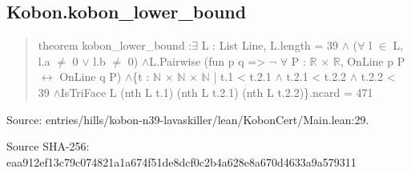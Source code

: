\documentclass[11pt,a4paper]{article}
\begin{document}
\begin{samepage}
\subsection{Kobon.kobon\_lower\_bound}
\begin{quote}\small\ttfamily theorem kobon\_lower\_bound :\newline     \ensuremath{\exists} L : List Line, L.length = 39 \ensuremath{\wedge} (\ensuremath{\forall} l \ensuremath{\in} L, l.a \ensuremath{\neq} 0 \ensuremath{\vee} l.b \ensuremath{\neq} 0) \ensuremath{\wedge}\newline       L.Pairwise (fun p q => \ensuremath{\neg} \ensuremath{\forall} P : \ensuremath{\mathbb{R}} \ensuremath{\times} \ensuremath{\mathbb{R}}, OnLine p P \ensuremath{\leftrightarrow} OnLine q P) \ensuremath{\wedge}\newline       \{t : \ensuremath{\mathbb{N}} \ensuremath{\times} \ensuremath{\mathbb{N}} \ensuremath{\times} \ensuremath{\mathbb{N}} | t.1 < t.2.1 \ensuremath{\wedge} t.2.1 < t.2.2 \ensuremath{\wedge} t.2.2 < 39 \ensuremath{\wedge}\newline         IsTriFace L (nth L t.1) (nth L t.2.1) (nth L t.2.2)\}.ncard = 471\end{quote}
{\small Source: entries/hills/kobon-n39-lavaskiller/lean/KobonCert/Main.lean:29.\par}

{\small Source SHA-256: eaa912ef13c79c074821a1a674f51de8dcf0c2b4a628e8a670d4633a9a579311\par}

\end{samepage}
\end{document}
